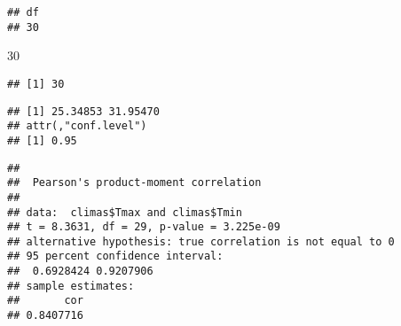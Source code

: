 \documentclass[
]{article}
\newenvironment{Shaded}{\begin{snugshade}}{\end{snugshade}}
\newcommand{\CommentTok}[1]{\textcolor[rgb]{0.56,0.35,0.01}{\textit{#1}}}
\newcommand{\DecValTok}[1]{\textcolor[rgb]{0.00,0.00,0.81}{#1}}
\newcommand{\FunctionTok}[1]{\textcolor[rgb]{0.00,0.00,0.00}{#1}}
\newcommand{\NormalTok}[1]{#1}
\newcommand{\SpecialCharTok}[1]{\textcolor[rgb]{0.00,0.00,0.00}{#1}}
\begin{document}
\begin{verbatim}
## df 
## 30
\end{verbatim}

\begin{Shaded}
\begin{Highlighting}[]
\DecValTok{30}
\end{Highlighting}
\end{Shaded}

\begin{verbatim}
## [1] 30
\end{verbatim}

\begin{Shaded}
\end{Shaded}

\begin{verbatim}
## [1] 25.34853 31.95470
## attr(,"conf.level")
## [1] 0.95
\end{verbatim}

\begin{Shaded}
\end{Shaded}

\begin{verbatim}
## 
##  Pearson's product-moment correlation
## 
## data:  climas$Tmax and climas$Tmin
## t = 8.3631, df = 29, p-value = 3.225e-09
## alternative hypothesis: true correlation is not equal to 0
## 95 percent confidence interval:
##  0.6928424 0.9207906
## sample estimates:
##       cor 
## 0.8407716
\end{verbatim}

\begin{Shaded}
\end{Shaded}
\end{document}
